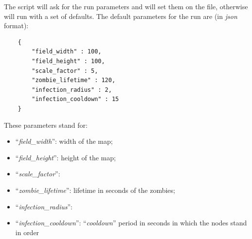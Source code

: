 \documentclass[conference]{IEEEtran}
\begin{document}
	The script will ask for the run parameters and will set them on the file, otherwise will run with a set of defaults.
	The default parameters for the run are (in \textit{json} format):
	\begin{verbatim}
    {
        "field_width" : 100,
        "field_height" : 100,
        "scale_factor" : 5,
        "zombie_lifetime" : 120,
        "infection_radius" : 2,
        "infection_cooldown" : 15
    }
	\end{verbatim}
	
	These parameters stand for:
	\begin{itemize}
		\item ``\textit{field\_width}'': width of the map;
		\item ``\textit{field\_height}'': height of the map;
		\item ``\textit{scale\_factor}'':
		\item ``\textit{zombie\_lifetime}'': lifetime in seconds of the zombies;
		\item ``\textit{infection\_radius}'':
		\item ``\textit{infection\_cooldown}'': ``\textit{cooldown}'' period in seconds in which the nodes stand in order
	\end{itemize}
	
\end{document}
